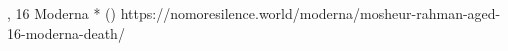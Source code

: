           {, }
          {16}
          {Moderna}
          {*}
          {
             ()
          }
          {https://nomoresilence.world/moderna/mosheur-rahman-aged-16-moderna-death/}

